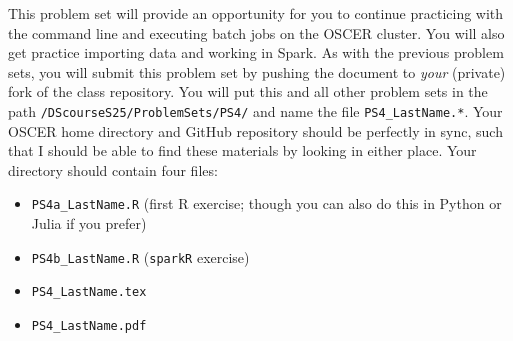 \documentclass[12pt,english]{exam}
\begin{document}
This problem set will provide an opportunity for you to continue practicing with the command line and executing batch jobs on the OSCER cluster. You will also get practice importing data and working in Spark. 
As with the previous problem sets, you will submit this problem set by pushing the document to \emph{your} (private) fork of the class repository. You will put this and all other problem sets in the path \texttt{/DScourseS25/ProblemSets/PS4/} and name the file \texttt{PS4\_LastName.*}. Your OSCER home directory and GitHub repository should be perfectly in sync, such that I should be able to find these materials by looking in either place. Your directory should contain four files:
\begin{itemize}
    \item \texttt{PS4a\_LastName.R} (first R exercise; though you can also do this in Python or Julia if you prefer)
    \item \texttt{PS4b\_LastName.R} (\texttt{sparkR} exercise)
    \item \texttt{PS4\_LastName.tex}
    \item \texttt{PS4\_LastName.pdf}
\end{itemize}
\end{document}
